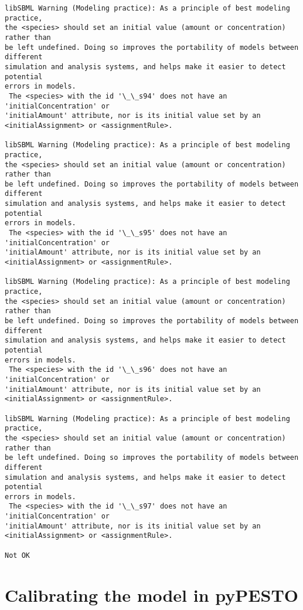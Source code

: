 \documentclass[11pt]{article}
\begin{document}
\begin{Verbatim}[commandchars=\\\{\}]
libSBML Warning (Modeling practice): As a principle of best modeling practice,
the <species> should set an initial value (amount or concentration) rather than
be left undefined. Doing so improves the portability of models between different
simulation and analysis systems, and helps make it easier to detect potential
errors in models.
 The <species> with the id '\_\_s94' does not have an 'initialConcentration' or
'initialAmount' attribute, nor is its initial value set by an
<initialAssignment> or <assignmentRule>.

libSBML Warning (Modeling practice): As a principle of best modeling practice,
the <species> should set an initial value (amount or concentration) rather than
be left undefined. Doing so improves the portability of models between different
simulation and analysis systems, and helps make it easier to detect potential
errors in models.
 The <species> with the id '\_\_s95' does not have an 'initialConcentration' or
'initialAmount' attribute, nor is its initial value set by an
<initialAssignment> or <assignmentRule>.

libSBML Warning (Modeling practice): As a principle of best modeling practice,
the <species> should set an initial value (amount or concentration) rather than
be left undefined. Doing so improves the portability of models between different
simulation and analysis systems, and helps make it easier to detect potential
errors in models.
 The <species> with the id '\_\_s96' does not have an 'initialConcentration' or
'initialAmount' attribute, nor is its initial value set by an
<initialAssignment> or <assignmentRule>.

libSBML Warning (Modeling practice): As a principle of best modeling practice,
the <species> should set an initial value (amount or concentration) rather than
be left undefined. Doing so improves the portability of models between different
simulation and analysis systems, and helps make it easier to detect potential
errors in models.
 The <species> with the id '\_\_s97' does not have an 'initialConcentration' or
'initialAmount' attribute, nor is its initial value set by an
<initialAssignment> or <assignmentRule>.

Not OK
    \end{Verbatim}

    \hypertarget{calibrating-the-model-in-pypesto}{%
\section{Calibrating the model in
pyPESTO}\label{calibrating-the-model-in-pypesto}}
\end{document}
